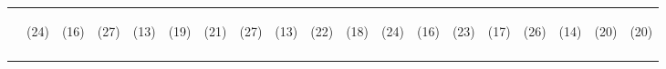 \begin{tabular}{lcccccccccccccccccc}
 & \begin{footnotesize}(24)\end{footnotesize} & \begin{footnotesize}(16)\end{footnotesize} & \begin{footnotesize}(27)\end{footnotesize} & \begin{footnotesize}(13)\end{footnotesize} & \begin{footnotesize}(19)\end{footnotesize} & \begin{footnotesize}(21)\end{footnotesize} & \begin{footnotesize}(27)\end{footnotesize} & \begin{footnotesize}(13)\end{footnotesize} & \begin{footnotesize}(22)\end{footnotesize} & \begin{footnotesize}(18)\end{footnotesize} & \begin{footnotesize}(24)\end{footnotesize} & \begin{footnotesize}(16)\end{footnotesize} & \begin{footnotesize}(23)\end{footnotesize} & \begin{footnotesize}(17)\end{footnotesize} & \begin{footnotesize}(26)\end{footnotesize} & \begin{footnotesize}(14)\end{footnotesize} & \begin{footnotesize}(20)\end{footnotesize} & \begin{footnotesize}(20)\end{footnotesize}\\
\noalign{\smallskip}\hline\end{tabular}\\
